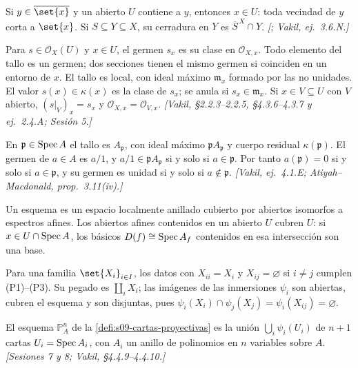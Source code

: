 \begin{obs}
\label{obs:s09-especializacion-local}
Si $y\in\overline{\set{x}}$ y un abierto $U$ contiene a $y$, entonces $x\in U$: toda vecindad de $y$ corta a $\set{x}$. Si $S\subseteq Y\subseteq X$, su cerradura en $Y$ es $\overline S^{\,X}\cap Y$. \emph{[; Vakil, ej.~3.6.N.]}
\end{obs}

\begin{defi}
\label{defi:s09-germen-tallo-valor}
Para $s\in\mathcal O_X(U)$ y $x\in U$, el germen $s_x$ es su clase en $\mathcal O_{X,x}$. Todo elemento del tallo es un germen; dos secciones tienen el mismo germen si coinciden en un entorno de $x$. El tallo es local, con ideal máximo $\mathfrak m_x$ formado por las no unidades. El valor $s(x)\in\kappa(x)$ es la clase de $s_x$; se anula si $s_x\in\mathfrak m_x$. Si $x\in V\subseteq U$ con $V$ abierto, $(s|_V)_x=s_x$ y $\mathcal O_{X,x}=\mathcal O_{V,x}$. \emph{[Vakil, \S2.2.3--2.2.5, \S4.3.6--4.3.7 y ej.~2.4.A; Sesión 5.]}
\end{defi}

\begin{prop}
\label{prop:s09-tallos-valores-afin}
En $\mathfrak p\in\operatorname{Spec} A$ el tallo es $A_{\mathfrak p}$, con ideal máximo $\mathfrak pA_{\mathfrak p}$ y cuerpo residual $\kappa(\mathfrak p)$. El germen de $a\in A$ es $a/1$, y $a/1\in\mathfrak pA_{\mathfrak p}$ si y solo si $a\in\mathfrak p$. Por tanto $a(\mathfrak p)=0$ si y solo si $a\in\mathfrak p$, y su germen es unidad si y solo si $a\notin\mathfrak p$. \emph{[Vakil, ej.~4.1.E; Atiyah--Macdonald, prop.~3.11(iv).]}
\end{prop}

\begin{defi}
\label{defi:s09-afines-disjuntas-cartas}
Un esquema es un espacio localmente anillado cubierto por abiertos isomorfos a espectros afines. Los abiertos afines contenidos en un abierto $U$ cubren $U$: si $x\in U\cap\operatorname{Spec} A$, los básicos $D(f)\cong\operatorname{Spec} A_f$ contenidos en esa intersección son una base.

Para una familia $\set{X_i}_{i\in I}$, los datos con $X_{ii}=X_i$ y $X_{ij}=\varnothing$ si $i\ne j$ cumplen (P1)--(P3). Su pegado es $\coprod_i X_i$; las imágenes de las inmersiones $\psi_i$ son abiertas, cubren el esquema y son disjuntas, pues $\psi_i(X_i)\cap\psi_j(X_j)=\psi_i(X_{ij})=\varnothing$.

El esquema $\mathbb P^n_A$ de la \cref{defi:s09-cartas-proyectivas} es la unión $\bigcup_i\psi_i(U_i)$ de $n+1$ cartas $U_i=\operatorname{Spec} A_i$, con $A_i$ un anillo de polinomios en $n$ variables sobre $A$. \emph{[Sesiones 7 y 8; Vakil, \S4.4.9--4.4.10.]}
\end{defi}

